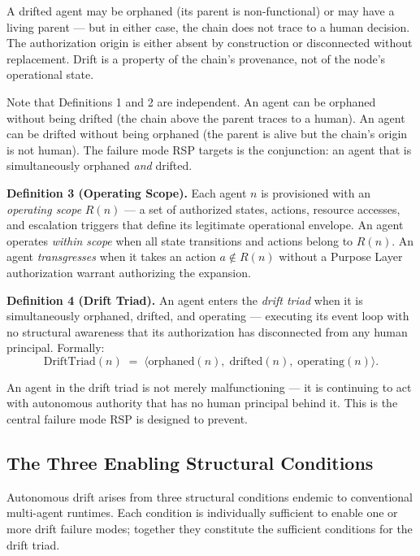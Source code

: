 A drifted agent may be orphaned (its parent is non-functional) or may have a living parent — but in either case, the chain does not trace to a human decision. The authorization origin is either absent by construction or disconnected without replacement. Drift is a property of the chain's provenance, not of the node's operational state.

Note that Definitions 1 and 2 are independent. An agent can be orphaned without being drifted (the chain above the parent traces to a human). An agent can be drifted without being orphaned (the parent is alive but the chain's origin is not human). The failure mode RSP targets is the conjunction: an agent that is simultaneously orphaned \emph{and} drifted.

\medskip
\noindent\textbf{Definition 3 (Operating Scope).} Each agent $n$ is provisioned with an \emph{operating scope} $R(n)$ — a set of authorized states, actions, resource accesses, and escalation triggers that define its legitimate operational envelope. An agent operates \emph{within scope} when all state transitions and actions belong to $R(n)$. An agent \emph{transgresses} when it takes an action $a \notin R(n)$ without a Purpose Layer authorization warrant authorizing the expansion.

\medskip
\noindent\textbf{Definition 4 (Drift Triad).} An agent enters the \emph{drift triad} when it is simultaneously orphaned, drifted, and operating — executing its event loop with no structural awareness that its authorization has disconnected from any human principal. Formally:
\begin{equation}
\text{DriftTriad}(n) \;=\; \bigl\langle \text{orphaned}(n),\; \text{drifted}(n),\; \text{operating}(n) \bigr\rangle.
\label{eq:drift-triad}
\end{equation}

An agent in the drift triad is not merely malfunctioning — it is continuing to act with autonomous authority that has no human principal behind it. This is the central failure mode RSP is designed to prevent.

\subsection{The Three Enabling Structural Conditions}

Autonomous drift arises from three structural conditions endemic to conventional multi-agent runtimes. Each condition is individually sufficient to enable one or more drift failure modes; together they constitute the sufficient conditions for the drift triad.


